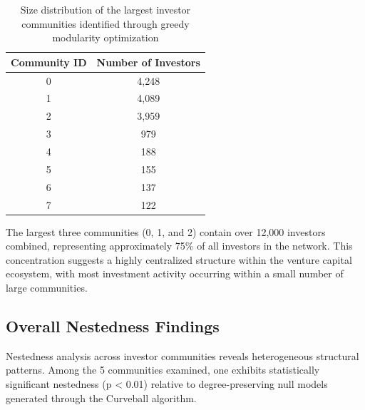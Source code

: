 
\begin{table}[htp]
\centering
\begin{tabular}{|c|c|}
\hline
\textbf{Community ID} & \textbf{Number of Investors} \\
\hline
0 & 4,248 \\
1 & 4,089 \\
2 & 3,959 \\
3 & 979 \\
4 & 188 \\
5 & 155 \\
6 & 137 \\
7 & 122 \\
\hline
\end{tabular}
\caption{Size distribution of the largest investor communities identified through greedy modularity optimization}
\label{tab:community_sizes}
\end{table}

The largest three communities (0, 1, and 2) contain over 12,000 investors combined, representing approximately 75\% of all investors in the network. This concentration suggests a highly centralized structure within the venture capital ecosystem, with most investment activity occurring within a small number of large communities. 




\subsection{Overall Nestedness Findings}

\newcommand{\numCommAnalysedNestedness}{5}

Nestedness analysis across investor communities reveals heterogeneous structural patterns. Among the \numCommAnalysedNestedness{} communities examined, one exhibits statistically significant nestedness (p < 0.01) relative to degree-preserving null models generated through the Curveball algorithm.

